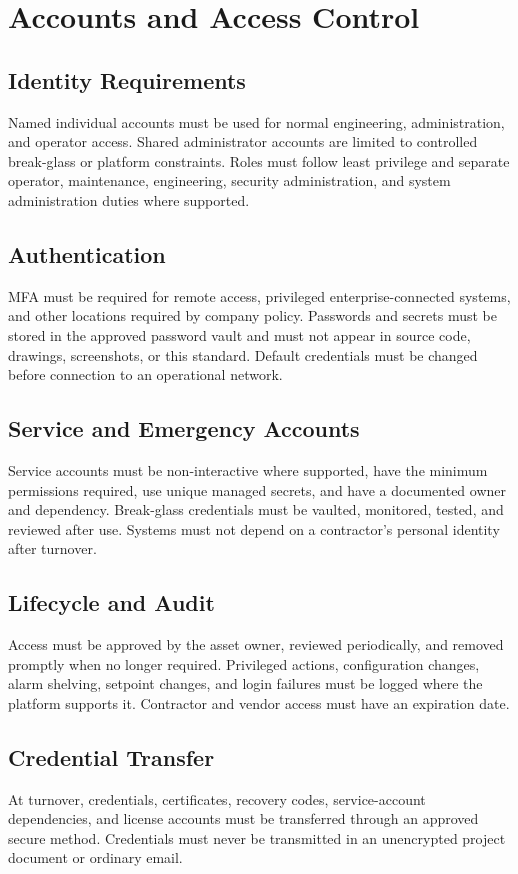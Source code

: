 \chapter{Accounts and Access Control}
\section{Identity Requirements}
Named individual accounts must be used for normal engineering, administration, and operator access. Shared administrator accounts are limited to controlled break-glass or platform constraints. Roles must follow least privilege and separate operator, maintenance, engineering, security administration, and system administration duties where supported.

\section{Authentication}
MFA must be required for remote access, privileged enterprise-connected systems, and other locations required by company policy. Passwords and secrets must be stored in the approved password vault and must not appear in source code, drawings, screenshots, or this standard. Default credentials must be changed before connection to an operational network.

\section{Service and Emergency Accounts}
Service accounts must be non-interactive where supported, have the minimum permissions required, use unique managed secrets, and have a documented owner and dependency. Break-glass credentials must be vaulted, monitored, tested, and reviewed after use. Systems must not depend on a contractor's personal identity after turnover.

\section{Lifecycle and Audit}
Access must be approved by the asset owner, reviewed periodically, and removed promptly when no longer required. Privileged actions, configuration changes, alarm shelving, setpoint changes, and login failures must be logged where the platform supports it. Contractor and vendor access must have an expiration date.

\section{Credential Transfer}
At turnover, credentials, certificates, recovery codes, service-account dependencies, and license accounts must be transferred through an approved secure method. Credentials must never be transmitted in an unencrypted project document or ordinary email.

